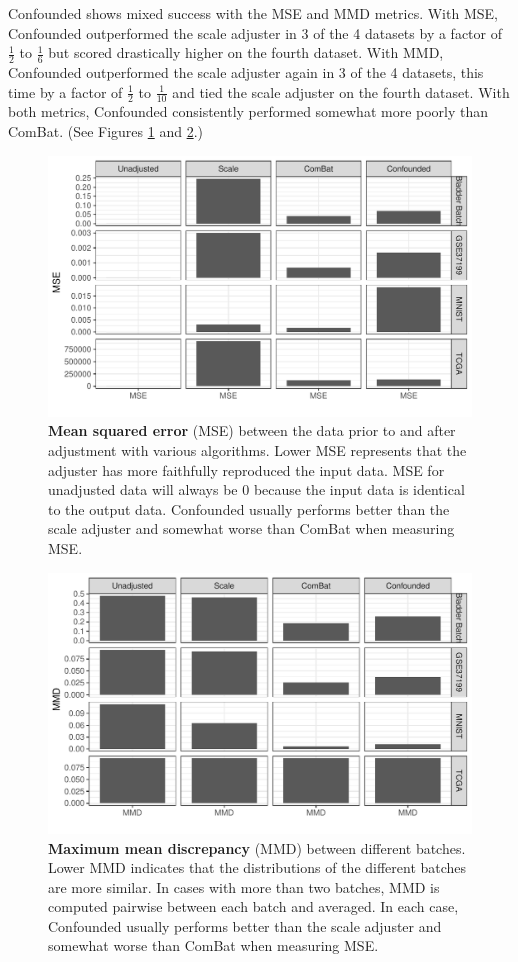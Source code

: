 \documentclass[notitlepage]{article}
\begin{document}
Confounded shows mixed success with the MSE and MMD metrics.
With MSE, Confounded outperformed the scale adjuster in 3 of the 4 datasets by a factor of $\frac{1}{2}$ to $\frac{1}{6}$ but scored drastically higher on the fourth dataset.
With MMD, Confounded outperformed the scale adjuster again in 3 of the 4 datasets, this time by a factor of $\frac{1}{2}$ to $\frac{1}{10}$ and tied the scale adjuster on the fourth dataset.
With both metrics, Confounded consistently performed somewhat more poorly than ComBat.
(See Figures \ref{fig:mse} and \ref{fig:mmd}.)

\begin{figure}
	\centering
	\includegraphics[width=\columnwidth]{figures/final/mse.pdf}
	\caption{\textbf{Mean squared error} (MSE) between the data prior to and after adjustment with various algorithms.
	Lower MSE represents that the adjuster has more faithfully reproduced the input data.
	MSE for unadjusted data will always be 0 because the input data is identical to the output data.
	Confounded usually performs better than the scale adjuster and somewhat worse than ComBat when measuring MSE.}
	\label{fig:mse}
\end{figure}
\begin{figure}
	\centering
	\includegraphics[width=\columnwidth]{figures/final/mmd.pdf}
	\caption{\textbf{Maximum mean discrepancy} (MMD) between different batches. Lower MMD indicates that the distributions of the different batches are more similar.
	In cases with more than two batches, MMD is computed pairwise between each batch and averaged.
	In each case, Confounded usually performs better than the scale adjuster and somewhat worse than ComBat when measuring MSE.}
	\label{fig:mmd}
\end{figure}
\end{document}
